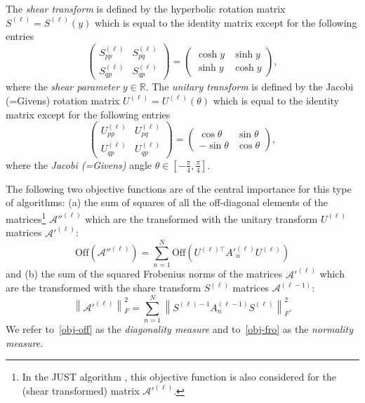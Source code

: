 \documentclass{article}
\newcommand{\norm}[1]{\left\|#1\right\|}
\newcommand{\rbra}[1]{\left(#1\right)}
\newcommand{\sbra}[1]{\left[#1\right]}
\newcommand{\off}{\mathrm{Off}}
\newcommand{\R}{\mathbb{R}}
\newcommand{\acal}{\mathcal{A}}
\begin{document}
The \emph{shear transform} is defined by the hyperbolic rotation matrix $S^{(\ell)} = S^{(\ell)}(y)$ which is equal to the identity matrix except for the following entries
\begin{equation}\label{shear}
\begin{pmatrix}
S^{(\ell)}_{pp} & S^{(\ell)}_{pq} \\
S^{(\ell)}_{qp} & S^{(\ell)}_{qp} 
\end{pmatrix}
=
\begin{pmatrix}
\cosh y & \sinh y \\
\sinh y & \cosh y
\end{pmatrix},
\end{equation}
where the \emph{shear parameter} $y\in\R$.
The \emph{unitary transform} is defined by the Jacobi (=Givens) rotation matrix $U^{(\ell)}= U^{(\ell)}(\theta)$ which is equal to the identity matrix except for the following entries
\begin{equation}\label{unitary}
\begin{pmatrix}
U^{(\ell)}_{pp} & U^{(\ell)}_{p	q} \\
U^{(\ell)}_{qp} & U^{(\ell)}_{qp} 
\end{pmatrix}
=
\begin{pmatrix}
\cos \theta & \sin \theta \\
-\sin \theta  & \cos \theta
\end{pmatrix},
\end{equation}
where the \emph{Jacobi (=Givens)} angle $\theta\in\sbra{-\frac{\pi}{4}, \frac{\pi}{4}}$.

The following two objective functions are of the central importance for this type of algorithms: (a) the sum of squares of all the off-diagonal elements of the matrices\footnote{In the JUST algorithm \citep{IfeEtAl2009}, this objective function is also considered for the (shear transformed) matrix $\acal'^{(\ell)}$.} $\acal''^{(\ell)}$ which are the transformed with the unitary transform $U^{(\ell)}$  matrices $\acal'^{(\ell)}$:
\begin{equation}
\label{obj-off}
\off\rbra{\acal''^{(\ell)}} = \sum_{n=1}^N \off \rbra{ U^{(\ell)\top}  A'^{(\ell)}_n U^{(\ell)} }
\end{equation}
and (b) the sum of the squared Frobenius norms of the matrices $\acal'^{(\ell)}$ which are the transformed with the share transform $S^{(\ell)}$ matrices $\acal^{(\ell-1)}$:
\begin{equation}\label{obj-fro}
\norm{\acal'^{(\ell)}}_F^2 = \sum_{n=1}^N \norm{ S^{(\ell)-1}A_n^{(\ell-1)}S^{(\ell)}}_F^2.
\end{equation}
We refer to~\eqref{obj-off} as the \emph{diagonality measure} and to~\eqref{obj-fro} as the \emph{normality measure}.
\end{document}
